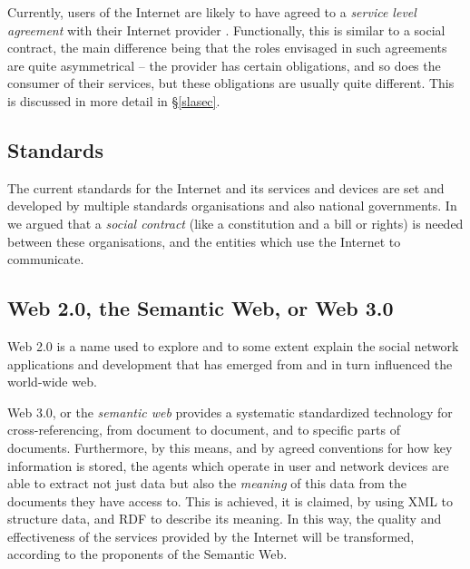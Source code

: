 Currently, users of the Internet are likely to have agreed to a {\em service level
agreement} with their Internet provider \cite{RFCs}. Functionally, this is similar to a social
contract, the main difference being that the roles envisaged in such agreements
are quite asymmetrical -- the provider has certain obligations, and so does the consumer
of their services, but these obligations are usually quite different. This is discussed
in more detail in \S\ref{slasec}.

\subsection{Standards}\label{standards}

The current standards for the Internet and its services and devices 
are set and developed by multiple standards organisations \cite{ietf} %
and also national governments. In \cite{sheniar2021social} we argued that a {\em social contract} 
(like a constitution and a bill or rights) is needed between
these organisations, and the entities which use the Internet to communicate.

\subsection{Web 2.0, the Semantic Web, or Web 3.0}\label{web2}

Web 2.0 \cite{tim2005web} is a name used to explore and to some extent explain
the social network applications and development that has emerged from 
and in turn influenced the world-wide web.


Web 3.0, or the {\em semantic web} \cite{berners2001semantic} provides a
systematic standardized technology for cross-referencing, from document
to document, and to specific parts of documents.  Furthermore, by this
means, and by agreed conventions for how key information is stored,
the agents which operate in user and network devices are able to extract
not just data but also the {\em meaning} of this data from the documents
they have access to.  This is achieved, it is claimed, by using XML to
structure data, and RDF \cite{rdf} to describe its meaning. In this way,
the quality and effectiveness of the services provided by the Internet
will be transformed, according to the proponents of the Semantic Web.

